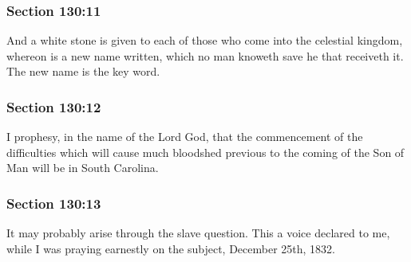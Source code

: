 	\subsubsection{Section 130:11} %
		\label{DC130-11}

		And a white stone is given to each of those who come into the celestial kingdom, whereon is a new name written, which no man knoweth save he that receiveth it. The new name is the key word.


	\subsubsection{Section 130:12} %
		\label{DC130-12}

		I prophesy, in the name of the Lord God, that the commencement of the difficulties which will cause much bloodshed previous to the coming of the Son of Man will be in South Carolina.


	\subsubsection{Section 130:13} %
		\label{DC130-13}

		It may probably arise through the slave question. This a voice declared to me, while I was praying earnestly on the subject, December 25th, 1832.


